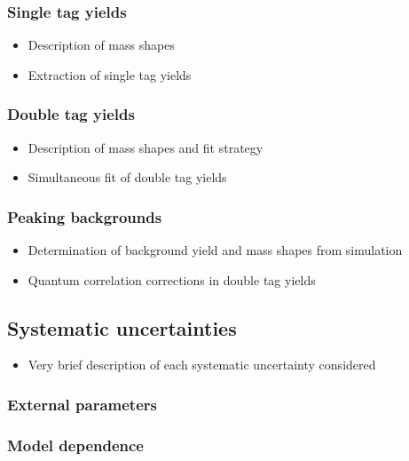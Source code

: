 \documentclass[12pt, a4paper, notitlepage, onecolumn]{article}
\begin{document}
\subsubsection{Single tag yields}
  \begin{itemize}[nosep]
    \setlength{\itemindent}{2.5em}
    \item[\textasteriskcentered]{Description of mass shapes}
    \item[\textasteriskcentered]{Extraction of single tag yields}
  \end{itemize}
\subsubsection{Double tag yields}
  \begin{itemize}[nosep]
    \setlength{\itemindent}{2.5em}
    \item[\textasteriskcentered]{Description of mass shapes and fit strategy}
    \item[\textasteriskcentered]{Simultaneous fit of double tag yields}
  \end{itemize}
\subsubsection{Peaking backgrounds}
  \begin{itemize}[nosep]
    \setlength{\itemindent}{2.5em}
    \item[\textasteriskcentered]{Determination of background yield and mass shapes from simulation}
    \item[\textasteriskcentered]{Quantum correlation corrections in double tag yields}
  \end{itemize}
\subsection{Systematic uncertainties}
  \begin{itemize}[nosep]
    \setlength{\itemindent}{2em}
    \item[\textendash]{Very brief description of each systematic uncertainty considered}
  \end{itemize}
\subsubsection{External parameters}
\subsubsection{Model dependence}
\end{document}
